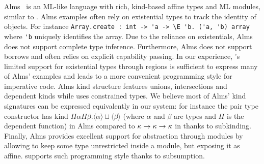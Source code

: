 Alms~\citep{DBLP:conf/popl/TovP11} is an ML-like language with rich, kind-based
affine types and ML modules, similar to \lang.
Alms examples often rely on existential types to track the identity
of objects. For instance
\lstinline/Array.create : int -> 'a -> \E 'b. ('a, 'b) array/ where
\lstinline/'b/ uniquely identifies the array.
Due to the reliance on existentials, Alms does not support complete type inference.
Furthermore, Alms does not support borrows and often relies
on explicit capability passing.
In our experience, \affe's limited support for existential types through
regions is sufficient to express many of Alms' examples and leads to
a more convenient programming style for imperative code.
%
Alms kind structure features unions, intersections and dependent kinds while
\lang uses constrained types.
We believe most of Alms' kind signatures can be expressed equivalently in
our system: for instance the pair type constructor
has kind $\Pi\alpha\Pi\beta. \langle\alpha\rangle \sqcup \langle\beta\rangle$
(where $\alpha$ and $\beta$ are types and $\Pi$ is the dependent function)
in Alms compared to $\kappa\to\kappa\to\kappa$ in \lang thanks
to subkinding.
%
Finally, Alms provides excellent support for abstraction through
modules by allowing to keep some type unrestricted inside a module, but
exposing it as affine. \lang supports
such programming style thanks to subsumption.

